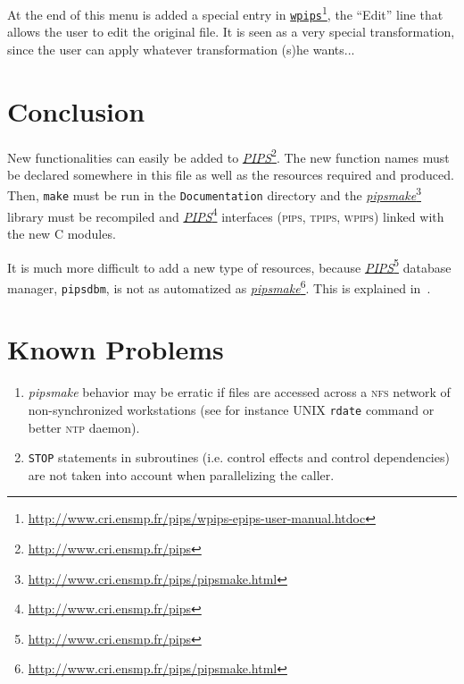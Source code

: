 \documentclass[a4paper]{report}
\newcommand{\LINK}[2]{\href{#2}{#1}\footnote{\url{#2}}\xspace}
\newcommand{\PIPS}{\LINK{\emph{PIPS}}{http://www.cri.ensmp.fr/pips}}
\newcommand{\PIPSMAKE}{\LINK{\emph{pipsmake}}{http://www.cri.ensmp.fr/pips/pipsmake.html}\xspace}
\newcommand{\WPIPS}{\LINK{\texttt{wpips}}{http://www.cri.ensmp.fr/pips/wpips-epips-user-manual.htdoc}}
\begin{document}

At the end of this menu is added a special entry in \WPIPS, the ``Edit'' line
that allows the user to edit the original file. It is seen as a very
special transformation, since the user can apply whatever
transformation (s)he wants...







\chapter{Conclusion}

New functionalities can easily be added to \PIPS{}. The new function names
must be declared somewhere in this file as well as the resources required
and produced. Then, {\tt make} must be run in the {\tt Documentation}
directory and the \PIPSMAKE library must be recompiled and \PIPS{}
interfaces (\textsc{pips}, \textsc{tpips}, \textsc{wpips}) linked with the
new C modules.

It is much more difficult to add a new type of resources, because \PIPS{}
database manager, \texttt{pipsdbm}, is not as automatized as
\PIPSMAKE. This is explained in~\cite{I94}.







\chapter{Known Problems}

\begin{enumerate}

\item {\em pipsmake} behavior may be erratic if files are accessed across
  a \textsc{nfs} network of non-synchronized workstations (see for
  instance UNIX \texttt{rdate} command or better \textsc{ntp} daemon).

\item \texttt{STOP} statements in subroutines (i.e. control effects and
control dependencies) are not taken into account when parallelizing the
caller.

\end{enumerate}
\end{document}
